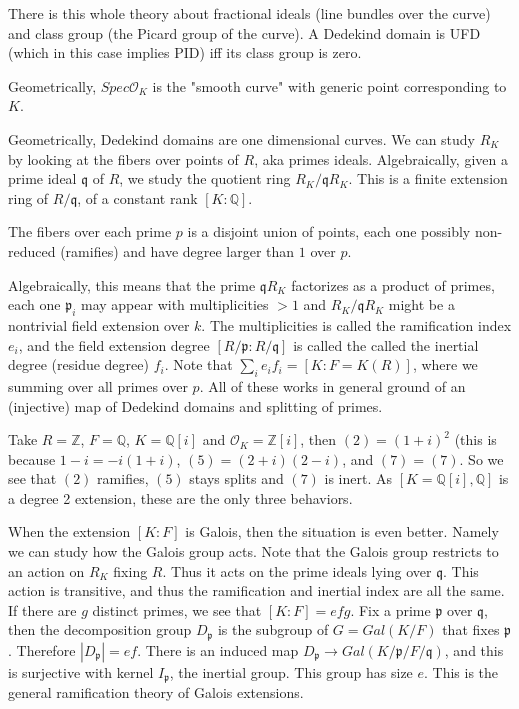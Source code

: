 \documentclass[main.tex]{subfiles}
\begin{document}
\begin{remark}
There is this whole theory about fractional ideals (line bundles over the curve) and class group (the Picard group of the curve). A Dedekind domain is UFD (which in this case implies PID) iff its class group is zero.
\end{remark}

Geometrically, $Spec \mathcal{O}_K$ is the "smooth curve" with generic point corresponding to $K$.

 Geometrically, Dedekind domains are one dimensional curves. We can study $R_K$ by looking at the fibers over points of $R$, aka primes ideals. Algebraically, given a prime ideal $\mathfrak{q}$ of $R$, we study the quotient ring $R_K/\mathfrak{q}R_K$. This is a finite extension ring of $R/\mathfrak{q}$, of a constant rank $[K: \mathbb{Q}]$. 

The fibers over each prime $p$ is a disjoint union of points, each one possibly non-reduced (ramifies) and have degree larger than $1$ over $p$.

Algebraically, this means that the prime $\mathfrak{q}R_K$ factorizes as a product of primes, each one $\mathfrak{p}_i$ may appear with multiplicities $ > 1$  and $R_K/\mathfrak{q}R_K$ might be a nontrivial field extension over $k$. The multiplicities is called the ramification index $e_i$, and the field extension degree $[R/\mathfrak{p}: R/\mathfrak{q}] $ is called the called the inertial degree (residue degree) $f_i$. Note that $\sum_i e_i f_i = [K : F = K(R)]$, where we summing over all primes over $p$. All of these works in general ground of an (injective) map of Dedekind domains and splitting of primes.



\begin{example}
Take $R = \mathbb{Z}$, $F = \mathbb{Q}$, $K = \mathbb{Q}[i]$ and $\mathcal{O}_K = \mathbb{Z}[i]$, then $(2) = (1+i)^2$ (this is because $1-i = -i (1 + i)$, $(5) = (2 + i) (2 -i)$, and $(7) = (7)$. So we see that $(2)$ ramifies, $(5)$ stays splits and $(7)$ is inert. As $[K = \mathbb{Q}[i], \mathbb{Q}]$ is a degree 2 extension, these are the only three behaviors.
\end{example}


When the extension $[K: F]$ is Galois, then the situation is even better. Namely we can study how the Galois group acts. Note that the Galois group restricts to an action on $R_K$ fixing $R$. Thus it acts on the prime ideals lying over $\mathfrak{q}$. This action is transitive, and thus the ramification and inertial index are all the same. If there are $g$ distinct primes, we see that $[K:F] = efg$. Fix a prime $\mathfrak{p}$ over $\mathfrak{q}$, then the decomposition group $D_\mathfrak{p}$ is the subgroup of $G = Gal(K/F)$ that fixes $\mathfrak{p}$. Therefore $|D_\mathfrak{p}| = ef$. There is an induced map $D_\mathfrak{p} \rightarrow Gal(K/\mathfrak{p}/F/\mathfrak{q})$, and this is surjective with kernel $I_\mathfrak{p}$, the inertial group. This group has size $e$. This is the general ramification theory of Galois extensions.
\end{document}
